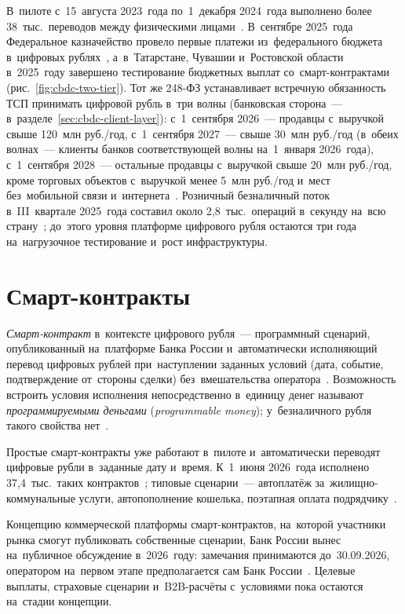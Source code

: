 В~пилоте с~15~августа 2023~года по~1~декабря 2024~года выполнено более
38~тыс.\ переводов между физическими лицами~\cite{cbr-onrnps-2025}. В~сентябре
2025~года Федеральное казначейство провело первые платежи из~федерального
бюджета в~цифровых рублях~\cite{minfin-dr-first-budget-payments-2025},
а~в~Татарстане, Чувашии и~Ростовской области в~2025~году завершено тестирование
бюджетных выплат со~смарт-контрактами~\cite{cbr-smart-contract-concept-2026}
(рис.~\ref{fig:cbdc-two-tier}). Тот же 248-ФЗ
устанавливает встречную обязанность ТСП принимать цифровой рубль в~три волны
(банковская сторона~--- в~разделе~\ref{sec:cbdc-client-layer}): с~1~сентября
2026~--- продавцы с~выручкой свыше 120~млн руб./год, с~1~сентября 2027~--- свыше
30~млн руб./год (в~обеих волнах~--- клиенты банков соответствующей волны
на~1~января 2026~года), с~1~сентября 2028~--- остальные продавцы с~выручкой свыше
20~млн руб./год, кроме торговых объектов с~выручкой менее 5~млн руб./год и~мест
без~мобильной связи и~интернета~\cite{fz-248}. Розничный безналичный
поток в~III~квартале 2025~года составил около 2,8~тыс.\ операций в~секунду
на~всю страну~\cite{cbr-payments-2025q3}; до~этого уровня платформе цифрового
рубля остаются три года на~нагрузочное тестирование и~рост инфраструктуры.

\section{Смарт-контракты}\label{sec:cbdc-smart-contracts}

\emph{Смарт-контракт} в~контексте цифрового рубля~--- программный сценарий,
опубликованный на~платформе Банка России и~автоматически исполняющий перевод
цифровых рублей при~наступлении заданных условий (дата, событие, подтверждение
от~стороны сделки) без~вмешательства оператора~\cite{cbr-digital-ruble}.
Возможность встроить условия исполнения непосредственно в~единицу денег называют
\emph{программируемыми деньгами} (\textit{programmable money}); у~безналичного
рубля такого свойства нет~\cite{bis-wp880-cbdc-architectures}.

Простые смарт-контракты уже работают в~пилоте и~автоматически переводят цифровые
рубли в~заданные дату и~время. К~1~июня 2026~года исполнено 37,4~тыс.\
таких контрактов~\cite{cbr-smart-contract-concept-2026}; типовые сценарии~--- автоплатёж
за~жилищно-коммунальные услуги, автопополнение кошелька, поэтапная оплата
подрядчику~\cite{gazprombank-smart-contracts-2025}.

Концепцию коммерческой платформы смарт-контрактов, на~которой участники рынка
смогут публиковать собственные сценарии, Банк России вынес на~публичное
обсуждение в~2026~году: замечания принимаются до~30.09.2026, оператором
на~первом этапе предполагается сам Банк
России~\cite{cbr-smart-contract-concept-2026}. Целевые выплаты, страховые
сценарии и~B2B-расчёты с~условиями пока остаются на~стадии концепции.

